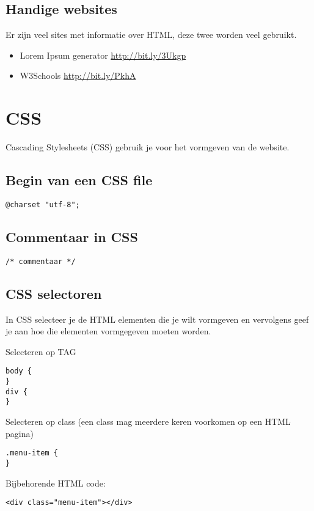 \documentclass[8pt,pagesize,footinclude=false,headinclude=false]{scrartcl}
\begin{document}
\begin{multicols*}{4}
\subsection*{Handige websites}
Er zijn veel sites met informatie over HTML, deze twee worden veel gebruikt.
\begin{itemize}
	\item Lorem Ipsum generator \url{http://bit.ly/3Ukgp} 
	\item W3Schools \url{http://bit.ly/PkhA}
\end{itemize}

\clearpage

\section*{CSS}
Cascading Stylesheets (CSS) gebruik je voor het vormgeven van de website. 

\subsection*{Begin van een CSS file}
\begin{lstlisting}
@charset "utf-8";
\end{lstlisting}

\subsection*{Commentaar in CSS}
\begin{lstlisting}
/* commentaar */
\end{lstlisting}

\subsection*{CSS selectoren}
In CSS selecteer je de HTML elementen die je wilt vormgeven en vervolgens geef je aan hoe die elementen vormgegeven moeten worden.

\noindent Selecteren op TAG
\begin{lstlisting}
body {
}
div {
}
\end{lstlisting}

\noindent Selecteren op class (een class mag meerdere keren voorkomen op een HTML pagina)
\begin{lstlisting}
.menu-item {
}
\end{lstlisting}
\noindent Bijbehorende HTML code:
\begin{lstlisting}
<div class="menu-item"></div>
\end{lstlisting}


\end{multicols*}
\end{document}
